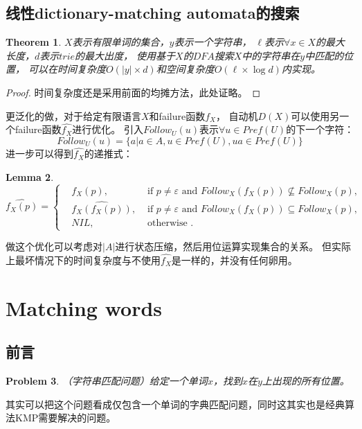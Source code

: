 \documentclass[UTF8]{ctexart}
\newtheorem{thm}{Theorem}[subsection]
\newtheorem{lem}[thm]{Lemma}
\newtheorem{prob}[thm]{Problem}
\theoremstyle{definition}
\theoremstyle{remark}
\numberwithin{equation}{subsection}
\begin{document}
\subsection{线性dictionary-matching automata的搜索}

	\begin{thm}
		$X$表示有限单词的集合，$y$表示一个字符串，
		$\ell$表示$\forall x \in X$的最大长度，$d$表示$trie$的最大出度，
		使用基于$X$的$DFA$搜索$X$中的字符串在$y$中匹配的位置，
		可以在时间复杂度$O(|y| \times d)$和空间复杂度$O(\ell \times \log d)$内实现。
	\end{thm}
	\begin{proof}
		时间复杂度还是采用前面的均摊方法，此处证略。
	\end{proof}
	
	更泛化的做，对于给定有限语言$X$和failure函数$f_X$，
	自动机$D(X)$可以使用另一个failure函数$\hat{f_X}$进行优化。
	引入$Follow_U(u)$表示$\forall u \in Pref(U)$的下一个字符：
	\[
		Follow_U(u) = \{a | a \in A, u \in Pref(U), ua \in Pref(U) \}
	\]
	进一步可以得到$\hat{f_X}$的递推式：
	\begin{lem}
		\[
			\hat{f_X(p)} =
			\left\{
				\begin{aligned}
					&f_X(p),			&\text{ if } p \neq \varepsilon \text{ and } Follow_X(f_X(p)) \nsubseteq Follow_X(p),   \\
					&\hat{f_X(f_X(p))},	&\text{ if } p \neq \varepsilon \text{ and } Follow_X(f_X(p)) \subseteq Follow_X(p),    \\   
					&NIL,				&\text{ otherwise }.
				\end{aligned}
			\right .
		\]
	\end{lem}
	做这个优化可以考虑对$|A|$进行状态压缩，然后用位运算实现集合的关系。
	但实际上最坏情况下的时间复杂度与不使用$\hat{f_X}$是一样的，并没有任何卵用。
	
\section{Matching words}

\subsection{前言}	
	
	\begin{prob}
		（字符串匹配问题）给定一个单词$x$，找到$x$在$y$上出现的所有位置。
	\end{prob}
	其实可以把这个问题看成仅包含一个单词的字典匹配问题，同时这其实也是经典算法KMP需要解决的问题。
	
\end{document}

